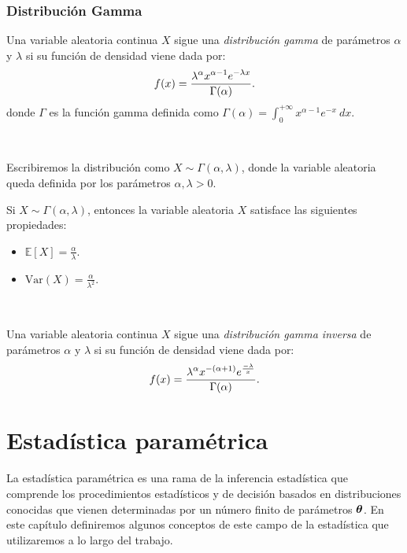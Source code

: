 \documentclass[oneside,openright,titlepage,numbers=noenddot,openany,headinclude,footinclude=true,
cleardoublepage=empty,abstractoff,BCOR=5mm,paper=a4,fontsize=12pt,main=spanish]{scrreprt}
\begin{document}
\subsection{Distribución Gamma}

\begin{definition}
Una variable aleatoria continua $X$ sigue una \textit{distribución gamma} de parámetros $\alpha$ y $\lambda$ si su función de densidad viene dada por: $$f(x)=\frac{\displaystyle \lambda^{\alpha}x^{\alpha-1}e^{-\lambda x}}{\displaystyle \Gamma(\alpha)}.$$
donde $\Gamma$ es la función gamma definida como $\Gamma(\alpha)=\displaystyle \int_0^{+\infty}x^{\alpha-1}e^{-x} \ dx$.
\end{definition}\

Escribiremos la distribución como $X \sim \Gamma(\alpha,\lambda)$, donde la variable aleatoria queda definida por los parámetros $\alpha,\lambda > 0$.\\

\begin{proposition}[Propiedades]
Si $X \sim \Gamma(\alpha,\lambda)$, entonces la variable aleatoria $X$ satisface las siguientes propiedades:
\begin{itemize}
    \item $\mathbb{E}[X]=\frac{\alpha}{\lambda}$.
    \item $\text{Var}(X)=\frac{\alpha}{\lambda^2}$.
\end{itemize}
\end{proposition}\

\begin{definition}
Una variable aleatoria continua $X$ sigue una \textit{distribución gamma inversa} de parámetros $\alpha$ y $\lambda$ si su función de densidad viene dada por: $$f(x)=\frac{\displaystyle \lambda^\alpha x^{-(\alpha+1)} e^{\frac{-\lambda}{x}}}{\displaystyle \Gamma(\alpha)}.$$
\end{definition}

\chapter{Estadística paramétrica}


La estadística paramétrica es una rama de la inferencia estadística que comprende los procedimientos estadísticos y de decisión basados en distribuciones conocidas que vienen determinadas por un número finito de parámetros $\bm{\theta}$. En este capítulo definiremos algunos conceptos de este campo de la estadística que utilizaremos a lo largo del trabajo.\\
\end{document}
